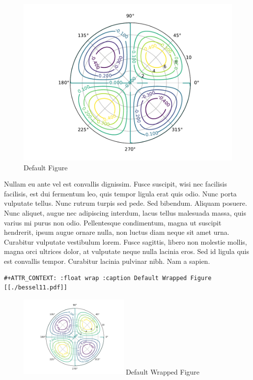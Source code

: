 \documentclass[11pt]{article}
\begin{document}
\begin{enumerate}
\begin{figure}[htbp]
\centering
\includegraphics[width=.9\linewidth]{./bessel11.pdf}
\caption{Default Figure}
\end{figure}

Nullam eu ante vel est convallis dignissim. Fusce suscipit, wisi nec facilisis
facilisis, est dui fermentum leo, quis tempor ligula erat quis odio. Nunc porta
vulputate tellus. Nunc rutrum turpis sed pede. Sed bibendum. Aliquam posuere.
Nunc aliquet, augue nec adipiscing interdum, lacus tellus malesuada massa, quis
varius mi purus non odio. Pellentesque condimentum, magna ut suscipit hendrerit,
ipsum augue ornare nulla, non luctus diam neque sit amet urna. Curabitur
vulputate vestibulum lorem. Fusce sagittis, libero non molestie mollis, magna
orci ultrices dolor, at vulputate neque nulla lacinia eros. Sed id ligula quis
est convallis tempor. Curabitur lacinia pulvinar nibh. Nam a sapien.

\begin{verbatim}
#+ATTR_CONTEXT: :float wrap :caption Default Wrapped Figure
[[./bessel11.pdf]]
\end{verbatim}

\begin{figure}
\centering
\includegraphics[width=0.48\textwidth]{./bessel11.pdf}
Default Wrapped Figure
\end{figure}


\end{enumerate}
\end{document}
